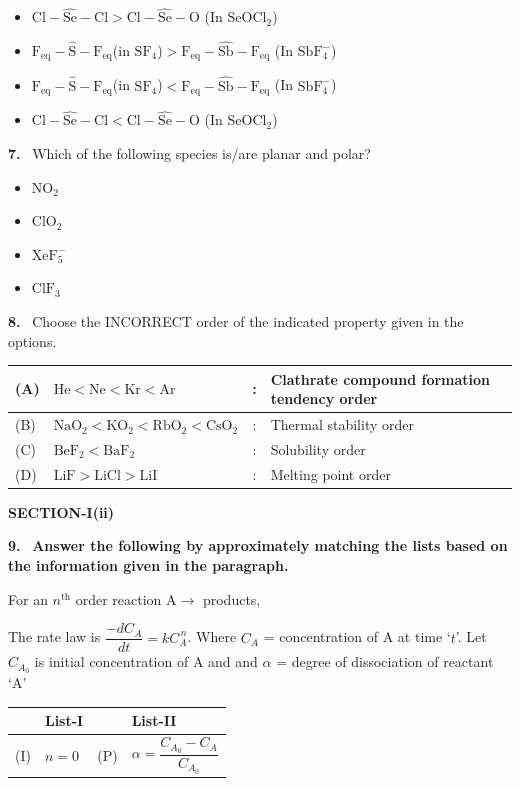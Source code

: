 \documentclass[10pt]{extarticle}
\newcommand{\sect}[1]{\par\smallskip\noindent\textbf{#1}\par}
\newcommand{\qn}[1]{\par\smallskip\noindent\textbf{#1.}~}
\newenvironment{qoptions}{\begin{itemize}[leftmargin=1.8em,itemsep=1pt,topsep=2pt,label={}]}{\end{itemize}}
\newcommand{\opt}[2]{\item[(#1)] #2}
\begin{document}
\begin{multicols}{2}
\begin{qoptions}
\opt{A}{$\mathrm{Cl{-}\widehat{Se}{-}Cl}>\mathrm{Cl{-}\widehat{Se}{-}O}$ (In $\mathrm{SeOCl_2}$)}
\opt{B}{$\mathrm{F_{eq}{-}\widehat{S}{-}F_{eq}}$(in $\mathrm{SF_4}$)$>\mathrm{F_{eq}{-}\widehat{Sb}{-}F_{eq}}$ (In $\mathrm{SbF_4^{-}}$)}
\opt{C}{$\mathrm{F_{eq}{-}\widehat{S}{-}F_{eq}}$(in $\mathrm{SF_4}$)$<\mathrm{F_{eq}{-}\widehat{Sb}{-}F_{eq}}$ (In $\mathrm{SbF_4^{-}}$)}
\opt{D}{$\mathrm{Cl{-}\widehat{Se}{-}Cl}<\mathrm{Cl{-}\widehat{Se}{-}O}$ (In $\mathrm{SeOCl_2}$)}
\end{qoptions}
\qn{7} Which of the following species is/are planar and polar?
\begin{qoptions}
\opt{A}{$\mathrm{NO_2}$}
\opt{B}{$\mathrm{ClO_2}$}
\opt{C}{$\mathrm{XeF_5^{-}}$}
\opt{D}{$\mathrm{ClF_3}$}
\end{qoptions}
\qn{8} Choose the INCORRECT order of the indicated property given in the options.
{\small\setlength{\tabcolsep}{3pt}\renewcommand{\arraystretch}{1.25}\begin{center}\begin{tabular}{|L{0.6cm}|L{3.3cm}|c|L{2.3cm}|}
\hline
(A) & $\mathrm{He<Ne<Kr<Ar}$ & : & Clathrate compound formation tendency order\\
\hline
(B) & $\mathrm{NaO_2}<\mathrm{KO_2}<\mathrm{RbO_2}<\mathrm{CsO_2}$ & : & Thermal stability order\\
\hline
(C) & $\mathrm{BeF_2<BaF_2}$ & : & Solubility order\\
\hline
(D) & $\mathrm{LiF>LiCl>LiI}$ & : & Melting point order\\
\hline
\end{tabular}\end{center}}
\sect{SECTION-I(ii)}
\qn{9} \textbf{Answer the following by approximately matching the lists based on the information given in the paragraph.}\par
For an $n^{\mathrm{th}}$ order reaction $\mathrm A\to$ products,\par
The rate law is $\dfrac{-dC_A}{dt}=kC_A^{\,n}$. Where $C_A$ = concentration of A at time `$t$'. Let $C_{A_0}$ is initial concentration of A and and $\alpha$ = degree of dissociation of reactant `A'
{\small\setlength{\tabcolsep}{3pt}\renewcommand{\arraystretch}{1.25}\begin{center}\begin{tabular}{|L{0.85cm}|L{1.2cm}|L{0.65cm}|L{3.5cm}|}
\hline
 & List-I & & List-II\\
\hline
(I) & $n=0$ & (P) & $\alpha=\dfrac{C_{A_0}-C_A}{C_{A_0}}$\\

\end{tabular}
\end{center}}
\end{multicols}
\end{document}
